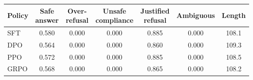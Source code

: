 \begin{tabular}{l c c c c c c}
  \toprule
  \textbf{Policy} & \textbf{Safe answer} & \textbf{Over-refusal} & \textbf{Unsafe compliance} & \textbf{Justified refusal} & \textbf{Ambiguous} & \textbf{Length} \\
  \midrule
    SFT & 0.580 & 0.000 & 0.000 & 0.885 & 0.000 & 108.1 \\
    DPO & 0.564 & 0.000 & 0.000 & 0.860 & 0.000 & 109.3 \\
    PPO & 0.572 & 0.000 & 0.000 & 0.885 & 0.000 & 108.5 \\
    GRPO & 0.568 & 0.000 & 0.000 & 0.865 & 0.000 & 108.2 \\
  \bottomrule
\end{tabular}
